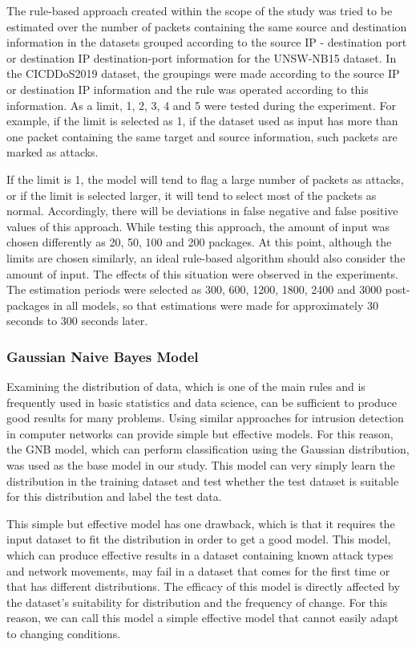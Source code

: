 \documentclass{article}
\begin{document}
The rule-based approach created within the scope of the study was tried to be estimated over the number of packets containing the same source and destination information in the datasets grouped according to the source IP - destination port or destination IP destination-port information for the UNSW-NB15 dataset. In the CICDDoS2019 dataset, the groupings were made according to the source IP or destination IP information and the rule was operated according to this information. As a limit, 1, 2, 3, 4 and 5 were tested during the experiment. For example, if the limit is selected as 1, if the dataset used as input has more than one packet containing the same target and source information, such packets are marked as attacks. 

If the limit is 1, the model will tend to flag a large number of packets as attacks, or if the limit is selected larger, it will tend to select most of the packets as normal. Accordingly, there will be deviations in false negative and false positive values of this approach. While testing this approach, the amount of input was chosen differently as 20, 50, 100 and 200 packages. At this point, although the limits are chosen similarly, an ideal rule-based algorithm should also consider the amount of input. The effects of this situation were observed in the experiments. The estimation periods were selected as 300, 600, 1200, 1800, 2400 and 3000 post-packages in all models, so that estimations were made for approximately 30 seconds to 300 seconds later.

\subsubsection{Gaussian Naive Bayes Model}

Examining the distribution of data, which is one of the main rules and is frequently used in basic statistics and data science, can be sufficient to produce good results for many problems. Using similar approaches for intrusion detection in computer networks can provide simple but effective models. For this reason, the GNB model, which can perform classification using the Gaussian distribution, was used as the base model in our study. This model can very simply learn the distribution in the training dataset and test whether the test dataset is suitable for this distribution and label the test data.

This simple but effective model has one drawback, which is that it requires the input dataset to fit the distribution in order to get a good model. This model, which can produce effective results in a dataset containing known attack types and network movements, may fail in a dataset that comes for the first time or that has different distributions. The efficacy of this model is directly affected by the dataset's suitability for distribution and the frequency of change. For this reason, we can call this model a simple effective model that cannot easily adapt to changing conditions.
\end{document}
